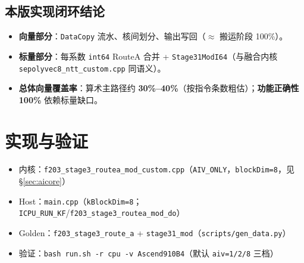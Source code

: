 \documentclass[UTF8,a4paper,11pt]{ctexart}
\begin{document}
\subsection{本版实现闭环结论}
\begin{itemize}
  \item \textbf{向量部分}：\texttt{DataCopy} 流水、核间划分、输出写回（$\approx$ 搬运阶段 100\%）。
  \item \textbf{标量部分}：每系数 \texttt{int64} RouteA 合并 + \texttt{Stage31ModI64}（与融合内核 \texttt{sepolyvec8\_ntt\_custom.cpp} 同语义）。
  \item \textbf{总体向量覆盖率}：算术主路径约 \textbf{30\%--40\%}（按指令条数粗估）；\textbf{功能正确性 100\%} 依赖标量缺口。
\end{itemize}

\section{实现与验证}

\begin{itemize}
  \item 内核：\texttt{f203\_stage3\_routea\_mod\_custom.cpp}（\texttt{AIV\_ONLY}，\texttt{blockDim=8}，见 §\ref{sec:aicore}）
  \item Host：\texttt{main.cpp}（\texttt{kBlockDim=8}；\texttt{ICPU\_RUN\_KF}/\texttt{f203\_stage3\_routea\_mod\_do}）
  \item Golden：\texttt{f203\_stage3\_route\_a} + \texttt{stage31\_mod}（\texttt{scripts/gen\_data.py}）
  \item 验证：\texttt{bash run.sh -r cpu -v Ascend910B4}（默认 \texttt{aiv=1/2/8} 三档）
\end{itemize}
\end{document}
